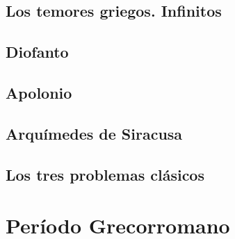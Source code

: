 \subsection{Los temores griegos. Infinitos}


\subsection{Diofanto}


\subsection{Apolonio}


\subsection{Arquímedes de Siracusa}


\subsection{Los tres problemas clásicos}


\section{Período Grecorromano}

